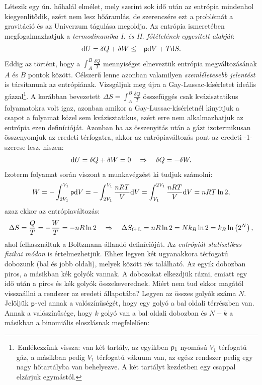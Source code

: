 Létezik egy ún. hőhalál elmélet, mely szerint sok idő után az entrópia mindenhol kiegyenlítődik, ezért nem lesz hőáramlás, de szerencsére ezt a problémát a gravitáció és az Univerzum tágulása megoldja. Az entrópia ismeretében megfogalmazhatjuk a \emph{termodinamika I. és II. főtételének egyesített alakját}:
\begin{align}
	\mathrm{d}U = \delta Q + \delta W \leq -\mathsf p\mathrm{d}V + T\mathrm{d}S.
\end{align}
Eddig az történt, hogy a $\int_A^B\frac{\delta Q}{T}$ mennyiséget elneveztük entrópia megváltozásának $A$ és $B$ pontok között. Célszerű lenne azonban valamilyen \emph{szemléletesebb jelentést} is társítanunk az entrópiának. Vizsgáljuk meg újra a Gay-Lussac-kísérletet ideális gázzal\footnote{\,Emlékezzünk vissza: van két tartály, az egyikben $\mathsf p_1$ nyomású $V_1$ térfogatú gáz, a másikban pedig $V_1$ térfogatú vákuum van, az egész rendszer pedig egy nagy hőtartályba van behelyezve. A két tartályt kezdetben egy csappal elzárjuk egymástól.}. A korábban bevezetett $\Delta S = \int_A^B\frac{\delta Q}{T}$ összefüggés csak kvázisztatikus folyamatokra volt igaz, azonban amikor a Gay-Lussac-kísérletnél kinyitjuk a csapot a folyamat közel sem kvázisztatikus, ezért erre nem alkalmazhatjuk az entrópia ezen definícióját. Azonban ha az összenyitás után a gázt izotermikusan összenyomjuk az eredeti térfogatra, akkor az entrópiaváltozás pont az eredeti -1-szerese lesz, hiszen:
\begin{align}
	\mathrm{d}U = \delta Q+\delta W = 0 \quad\Rightarrow\quad \delta Q = -\delta W.
\end{align}
Izoterm folyamat során viszont a munkavégzést ki tudjuk számolni:
\begin{align}
	W = -\int_{2V_1}^{V_1}\mathsf p \mathrm{d}V = -\int_{2V_1}^{V_1}\frac{nRT}{V}\mathrm{d}V = \int_{V_1}^{2V_1}\frac{nRT}{V}\mathrm{d}V = nRT\ln 2,
\end{align}
azaz ekkor az entrópiaváltozás:
\begin{align}
	\Delta S = \frac QT = -\frac WT = -nR\ln 2 \quad\Rightarrow\quad \Delta S_{\textnormal{G-L}} = nR\ln 2 = Nk_B\ln2 = k_B\ln\left({2^N}\right),
\end{align}
ahol felhasználtuk a Boltzmann-állandó definícióját. Az \emph{entrópiát statisztikus fizikai módon} is értelmezhetjük. Ehhez legyen két ugyanakkora térfogatú dobozunk (bal és jobb oldali), melyek között rés található. Az egyik dobozban piros, a másikban kék golyók vannak. A dobozokat elkezdjük rázni, emiatt egy idő után a piros és kék golyók összekeverednek. Miért nem tud ekkor magától visszaállni a rendszer az eredeti állapotába? Legyen az összes golyók száma $N$. Jelöljük $\mathtt p$-vel annak a valószínűségét, hogy egy golyó a bal oldali térrészben van. Annak a valószínűsége, hogy $k$ golyó van a bal oldali dobozban és $N-k$ a másikban a binomiális eloszlásnak megfelelően:
